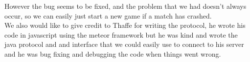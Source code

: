 \documentclass[12pt, a4paper]{article}
\begin{document}
However the bug seems to be fixed, and the problem that we had doesn't always occur, so we can easily just start a new game if a match has crashed. \\
We also would like to give credit to Thaffe for writing the protocol, he wrote his code in javascript using the meteor framework  but he was kind and wrote the java protocol and and interface that we could easily use to connect to his server and he was bug fixing and debugging the code when things went wrong.
\end{document}
